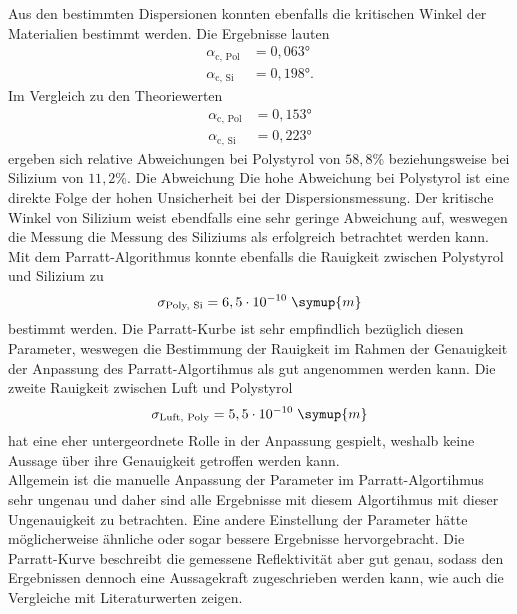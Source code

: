 Aus den bestimmten Dispersionen konnten ebenfalls die kritischen Winkel der Materialien bestimmt
werden. Die Ergebnisse lauten 
\begin{align*}
    \alpha_{\text{c, Pol}} &= 0,063°\\
    \alpha_{\text{c, Si}} &= 0,198°.
\end{align*}
Im Vergleich zu den Theoriewerten \cite{tolan} 
\begin{align*}
    \alpha_{\text{c, Pol}} &= 0,153°\\
    \alpha_{\text{c, Si}} &= 0,223°
\end{align*}
ergeben sich relative Abweichungen bei Polystyrol von $58,8\%$ beziehungsweise bei Silizium von $11,2\%$. Die Abweichung 
Die hohe Abweichung bei Polystyrol ist eine direkte Folge der hohen Unsicherheit bei der Dispersionsmessung.
Der kritische Winkel von Silizium weist ebendfalls eine sehr geringe Abweichung auf, weswegen 
die Messung die Messung des Siliziums als erfolgreich betrachtet werden kann.\\
Mit dem Parratt-Algorithmus konnte ebenfalls die Rauigkeit zwischen Polystyrol und 
Silizium zu 
\begin{equation*}
    \sigma_{\text{Poly, Si}} = 6,5 \cdot 10^{-10} \;\symup{m}
\end{equation*}
bestimmt werden. Die Parratt-Kurbe ist sehr empfindlich bezüglich diesen Parameter, weswegen 
die Bestimmung der Rauigkeit im Rahmen der Genauigkeit der Anpassung des Parratt-Algortihmus
als gut angenommen werden kann.
Die zweite Rauigkeit zwischen Luft und Polystyrol 
\begin{equation*}
    \sigma_{\text{Luft, Poly}} = 5,5 \cdot 10^{-10} \;\symup{m} 
\end{equation*}
hat eine eher untergeordnete Rolle in der Anpassung gespielt, weshalb keine Aussage über
ihre Genauigkeit getroffen werden kann.\\
Allgemein ist die manuelle Anpassung der Parameter im Parratt-Algortihmus sehr ungenau 
und daher sind alle Ergebnisse mit diesem Algortihmus mit dieser Ungenauigkeit zu betrachten.
Eine andere Einstellung der Parameter hätte möglicherweise ähnliche oder sogar bessere 
Ergebnisse hervorgebracht. Die Parratt-Kurve beschreibt die gemessene Reflektivität
aber gut genau, sodass den Ergebnissen dennoch eine Aussagekraft zugeschrieben werden kann, wie 
auch die Vergleiche mit Literaturwerten zeigen. 
